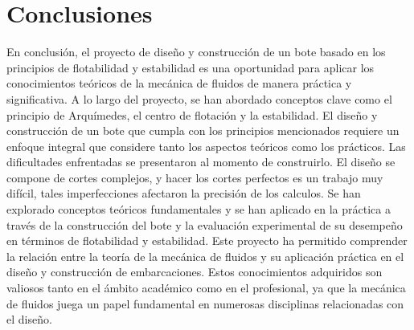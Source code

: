 \documentclass[letterpaper]{article}
\begin{document}
		

\section{Conclusiones}
En conclusión, el proyecto de diseño y construcción de un bote basado en los principios de flotabilidad y estabilidad es una oportunidad para aplicar los conocimientos teóricos de la mecánica de fluidos de manera práctica y significativa. A lo largo del proyecto, se han abordado conceptos clave como el principio de Arquímedes, el centro de flotación y la estabilidad.
El diseño y construcción de un bote que cumpla con los principios mencionados requiere un enfoque integral que considere tanto los aspectos teóricos como los prácticos. Las dificultades enfrentadas se presentaron al momento de construirlo. El diseño se compone de cortes complejos, y hacer los cortes perfectos es un trabajo muy difícil, tales imperfecciones afectaron la precisión de los calculos. Se han explorado conceptos teóricos fundamentales y se han aplicado en la práctica a través de la construcción del bote y la evaluación experimental de su desempeño en términos de flotabilidad y estabilidad.
Este proyecto ha permitido comprender la relación entre la teoría de la mecánica de fluidos y su aplicación práctica en el diseño y construcción de embarcaciones. Estos conocimientos adquiridos son valiosos tanto en el ámbito académico como en el profesional, ya que la mecánica de fluidos juega un papel fundamental en numerosas disciplinas relacionadas con el diseño.


\newpage
\section*{}

\nocite{*}

\end{document}
